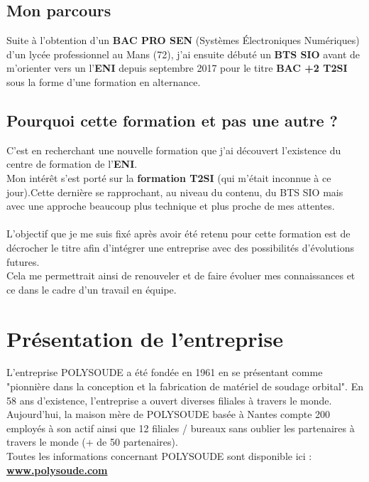 \documentclass[11pt,a4paper,oneside]{article}
\begin{document}
\subsection*{Mon parcours}
Suite à l’obtention d’un \textbf{BAC PRO SEN} (Systèmes Électroniques Numériques) d'un lycée professionnel au Mans (72), j’ai ensuite débuté un \textbf{BTS SIO} avant de m’orienter vers un l'\textbf{ENI} depuis septembre 2017 pour le titre \textbf{BAC +2 T2SI} sous la forme d'une formation en alternance.

\subsection*{Pourquoi cette formation et pas une autre ?}

C'est en recherchant une nouvelle formation que j'ai découvert l'existence du centre de formation de l'\textbf{ENI}.\\

Mon intérêt s’est porté sur la \textbf{formation T2SI} (qui m'était inconnue à ce jour).Cette dernière se rapprochant, au niveau du contenu, du BTS SIO mais avec une approche beaucoup plus technique et plus proche de mes attentes. \\
\\
L’objectif que je me suis fixé après avoir été retenu pour cette formation est de décrocher le titre afin d’intégrer une entreprise avec des possibilités d’évolutions futures.\\
Cela me permettrait ainsi de renouveler et de faire évoluer mes connaissances et ce dans le cadre d’un travail en équipe.
\newpage

\section{Présentation de l'entreprise}
L'entreprise POLYSOUDE a été fondée en 1961 en se présentant comme "pionnière dans la conception et la fabrication de matériel de soudage orbital". En 58 ans d'existence, l'entreprise a ouvert diverses filiales à travers le monde.\\

Aujourd'hui, la maison mère de POLYSOUDE basée à Nantes compte 200 employés à son actif ainsi que 12 filiales / bureaux sans oublier les partenaires à travers le monde (+ de 50 partenaires). \\

Toutes les informations concernant POLYSOUDE sont disponible ici : \textbf{\hyperlink{https://www.polysoude.com/}{www.polysoude.com}}
\end{document}
